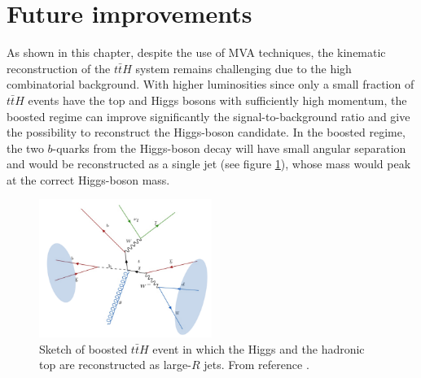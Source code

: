 \section{Future improvements}

As shown in this chapter, despite the use of MVA techniques, the kinematic reconstruction of the $t\bar{t}H$ system remains challenging due to the high combinatorial background. With higher luminosities since only a small fraction of $t\bar{t}H$ events have the top and Higgs bosons with sufficiently high momentum, the boosted regime can improve significantly the signal-to-background ratio and give the possibility to reconstruct the Higgs-boson candidate. In the boosted regime, the two $b$-quarks from the Higgs-boson decay will have small angular separation and would be reconstructed as a single jet (see figure \ref{sec:ttH:fig:boost}), whose mass would peak at the correct Higgs-boson mass.

\begin{figure}[h!]
\centering
\includegraphics[width=0.5\textwidth]{figures/ttH/boosted.png}
\captionsetup{width=0.85\textwidth} \caption{\small Sketch of boosted $t\bar{t}H$ event in which the Higgs and the hadronic top are reconstructed as large-$R$ jets. From reference \cite{Moretti:2015vaa}.}
\label{sec:ttH:fig:boost}
\end{figure}


